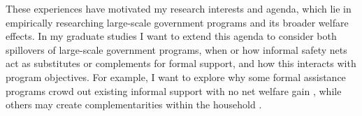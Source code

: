 These experiences have motivated my research interests and agenda, which lie in empirically researching large-scale government programs and its broader welfare effects. In my graduate studies I want to extend this agenda to consider both spillovers of large-scale government programs, when or how informal safety nets act as substitutes or complements for formal support, and how this interacts with program objectives. For example, I want to explore why some formal assistance programs crowd out existing informal support with no net welfare gain \citep[e.g.,][]{havnes_mogstad2015}, while others may create complementarities within the household \citep{rennane2020}.
